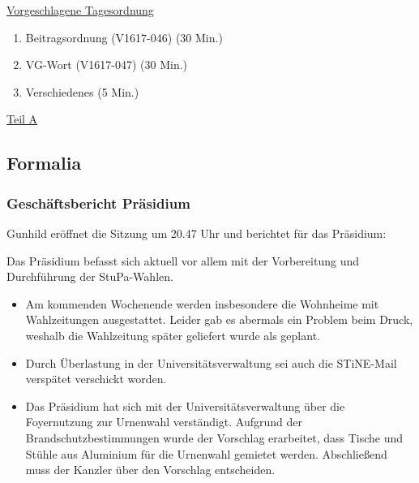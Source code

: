 \documentclass[ngerman,headheight=70pt]{scrartcl}
\begin{document}
    \newpage
    \underline{Vorgeschlagene Tagesordnung}
    \begin{enumerate}[label={\textbf{Top \theenumi}},leftmargin=*]
        \item Beitragsordnung (V1617-046) (30 Min.)
        \item VG-Wort (V1617-047) (30 Min.)
        \item Verschiedenes (5 Min.)
    \end{enumerate}

    \newpage


    {\Large \underline{Teil A}}

    \subsection{Formalia}

    \subsubsection{Geschäftsbericht Präsidium}

    Gunhild eröffnet die Sitzung um 20.47 Uhr und berichtet für das Präsidium:

    Das Präsidium befasst sich aktuell vor allem mit der Vorbereitung und Durchführung der StuPa-Wahlen.
    \begin{itemize}
        \item Am kommenden Wochenende werden insbesondere die Wohnheime mit
        Wahlzeitungen ausgestattet. Leider gab es abermals ein Problem beim
        Druck, weshalb die Wahlzeitung später geliefert wurde als geplant.
        \item Durch Überlastung in der Universitätsverwaltung sei auch die
        STiNE-Mail verspätet verschickt worden.
    	\item Das Präsidium hat sich mit der Universitätsverwaltung über die
        Foyernutzung zur Urnenwahl verständigt. Aufgrund der
        Brandschutzbestimmungen wurde der Vorschlag erarbeitet, dass Tische und
        Stühle aus Aluminium für die Urnenwahl gemietet werden. Abschließend muss
        der Kanzler über den Vorschlag entscheiden.
    \end{itemize}
\end{document}
